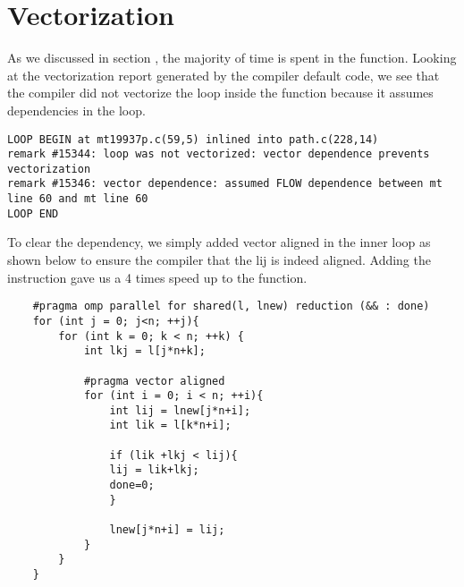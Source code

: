 \section{Vectorization}\label{sec:vectorization}
As we discussed in section , the majority of time is spent in the  function. Looking at the vectorization report generated by the compiler default code, we see that the compiler did not vectorize the  loop inside the  function because it assumes dependencies in the loop.

\begin{verbatim}
LOOP BEGIN at mt19937p.c(59,5) inlined into path.c(228,14)
remark #15344: loop was not vectorized: vector dependence prevents vectorization
remark #15346: vector dependence: assumed FLOW dependence between mt line 60 and mt line 60
LOOP END
\end{verbatim}

To clear the dependency, we simply added  vector aligned in the inner loop as shown below to ensure the compiler that the lij is indeed aligned.  Adding the  instruction gave us a 4 times speed up to the  function. 


\begin{verbatim}
	#pragma omp parallel for shared(l, lnew) reduction (&& : done)
	for (int j = 0; j<n; ++j){
		for (int k = 0; k < n; ++k) {
			int lkj = l[j*n+k];
			
			#pragma vector aligned
			for (int i = 0; i < n; ++i){
				int lij = lnew[j*n+i];
				int lik = l[k*n+i];
				
				if (lik +lkj < lij){
				lij = lik+lkj;
				done=0;
				}
				
				lnew[j*n+i] = lij;
			}
		}
	}
\end{verbatim}


